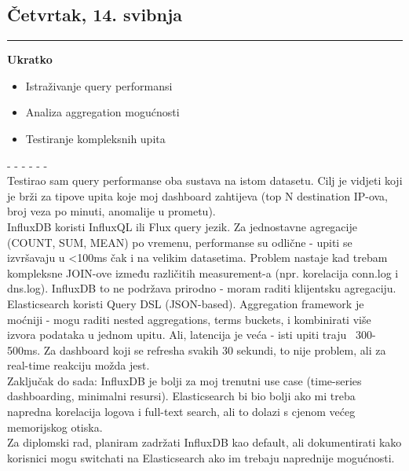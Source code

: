 \documentclass[12pt, a4paper]{article}
\newcommand{\dan}[1]{
    \subsection*{#1}
    \vspace{-0.5em} 
    \hrule \vspace{0.5em} 
}
\begin{document}
\dan{Četvrtak, 14. svibnja}
\textbf{Ukratko}
\begin{itemize}
    \item Istraživanje query performansi
    \item Analiza aggregation mogućnosti
    \item Testiranje kompleksnih upita
\end{itemize}
- - - - - - \\
Testirao sam query performanse oba sustava na istom datasetu. Cilj je vidjeti koji je brži za tipove upita koje moj dashboard zahtijeva (top N destination IP-ova, broj veza po minuti, anomalije u prometu).
\\
InfluxDB koristi InfluxQL ili Flux query jezik. Za jednostavne agregacije (COUNT, SUM, MEAN) po vremenu, performanse su odlične - upiti se izvršavaju u <100ms čak i na velikim datasetima. Problem nastaje kad trebam kompleksne JOIN-ove između različitih measurement-a (npr. korelacija conn.log i dns.log). InfluxDB to ne podržava prirodno - moram raditi klijentsku agregaciju.
\\
Elasticsearch koristi Query DSL (JSON-based). Aggregation framework je moćniji - mogu raditi nested aggregations, terms buckets, i kombinirati više izvora podataka u jednom upitu. Ali, latencija je veća - isti upiti traju ~300-500ms. Za dashboard koji se refresha svakih 30 sekundi, to nije problem, ali za real-time reakciju možda jest.
\\
Zaključak do sada: InfluxDB je bolji za moj trenutni use case (time-series dashboarding, minimalni resursi). Elasticsearch bi bio bolji ako mi treba napredna korelacija logova i full-text search, ali to dolazi s cjenom većeg memorijskog otiska.
\\
Za diplomski rad, planiram zadržati InfluxDB kao default, ali dokumentirati kako korisnici mogu switchati na Elasticsearch ako im trebaju naprednije mogućnosti.
\end{document}
